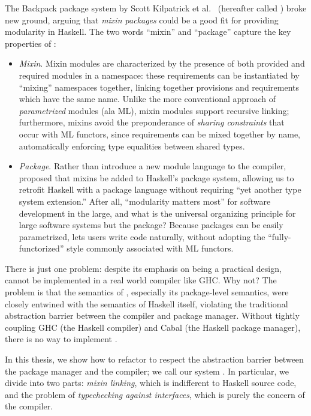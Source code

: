 The Backpack package system by Scott Kilpatrick et al.~\cite{backpack}
(hereafter called \OldBackpack{}) broke new ground, arguing that \emph{mixin
packages} could be a good fit for providing modularity in Haskell.
The two words ``mixin'' and ``package'' capture the key properties of \OldBackpack{}:

\begin{itemize}
    \item \emph{Mixin}. Mixin modules are characterized by the
    presence of both provided and required modules in a namespace:
    these requirements can be instantiated by ``mixing'' namespaces
    together, linking together provisions and requirements which have
    the same name.  Unlike the more conventional approach of
    \emph{parametrized} modules (ala ML),
    mixin modules support recursive linking;  furthermore, mixins avoid
    the preponderance of \emph{sharing constraints} that occur with ML
    functors, since requirements can be mixed together by name, automatically
    enforcing type equalities between shared types.

    \item \emph{Package}. Rather than introduce a new module language
    to the compiler, \OldBackpack{} proposed that mixins be added to
    Haskell's package system, allowing us to retrofit Haskell with
    a package language without requiring ``yet another type system extension.''
    After all, ``modularity matters most'' for software development in
    the large, and what is the universal organizing principle for large
    software systems but the package?  Because packages can be easily
    parametrized, \OldBackpack{} lets users write code naturally, without
    adopting the ``fully-functorized'' style
    commonly associated with ML functors.
\end{itemize}
%
There is just one problem: despite its emphasis on being a practical
design, \OldBackpack{} cannot be implemented in a real world compiler
like GHC\@.  Why not? The problem is that the
semantics of \OldBackpack{}, especially its package-level semantics,
were closely entwined with the semantics of Haskell itself,  violating
the traditional abstraction barrier between the compiler and package
manager.  Without tightly coupling GHC (the Haskell compiler) and Cabal
(the Haskell package manager), there is no way to implement
\OldBackpack{}.

In this thesis, we show how to refactor
\OldBackpack{} to respect the abstraction barrier between the package
manager and the compiler; we call our system \Backpack{}.  In
particular, we divide \Backpack{} into two parts: \emph{mixin linking},
which is indifferent to Haskell source code, and the problem of
\emph{typechecking against interfaces}, which is purely the concern of
the compiler.

